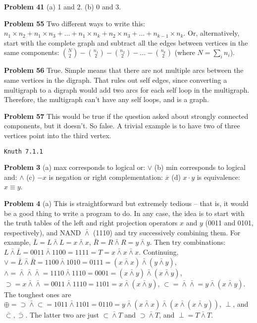 \vskip 0.1in
\noindent
{\bf Problem 41} (a) 1 and 2. (b) 0 and 3.

\vskip 0.1in
\noindent
{\bf Problem 55} Two different ways to write this: $n_1 \times n_2 +
n_1 \times n_3 + \ldots + n_1 \times n_k + n_2 \times n_3 + \ldots + 
n_{k-1} \times n_k$.  Or, alternatively, start with the complete graph
and subtract all the edges between vertices in the same components:
${N \choose 2} - {n_1 \choose 2} - {n_2 \choose 2} - \ldots - {n_k \choose 2}$
(where $N = \sum_i n_i$).

\vskip 0.1in
\noindent
{\bf Problem 56} True.  Simple means that there are not multiple arcs between
the same vertices in the digraph.  That rules out self edges, since converting
a multigraph to a digraph would add two arcs for each self loop in the multigraph.
Therefore, the multigraph can't have any self loops, and is a graph.

\vskip 0.1in
\noindent
{\bf Problem 57} This would be true if the question asked about strongly
connected components, but it doesn't.  So false.  A trivial example is to
have two of three vertices point into the third vertex.

\topglue 0.5in
\centerline{\tt Knuth 7.1.1}
\vskip 0.3in

\noindent
{\bf Problem 3} (a) max corresponds to logical or: $\vee$ (b) min corresponds to 
logical and: $\wedge$ (c) $-x$ is negation or right complementation: $\overline{x}$
(d) $x \cdot y$ is equivalence: $x \equiv y$.

\vskip 0.1in
\noindent
{\bf Problem 4} (a) This is straightforward but extremely tedious -- that is,
it would be a good thing to write a program to do.  In any case, the idea
is to start with the truth tables of the left and right projection operators
$x$ and $y$ (0011 and 0101, respectively), and NAND $\bar \land$ (1110)
and try successively combining them.  For example, $\bar L = L \bar \land L = x \bar
\land x$, $\bar R = R \bar \land R = y \bar \land y$.  Then try combinations:
$L \bar \land \bar L = 0011 \bar \land 1100 = 1111 = T = x \bar \land x \bar \land x$.
Continuing, $\vee = \bar L \bar \land \bar R = 1100 \bar \land 1010 = 0111 =
\left(x \bar \land x\right) \bar \land \left(y \bar \land y\right)$,
$\land = \bar \land \bar \land \bar \land = 1110 \bar \land 1110 = 0001 = 
\left(x \bar \land y \right) \bar \land \left( x \bar \land y \right)$,
$\supset = x \bar \land \bar \land = 0011 \bar \land 1110 = 1101 = 
x \bar \land \left(x \bar \land y\right)$, $\subset = \bar \land \bar \land =
y \bar \land \left(x \bar \land y\right)$.
The toughest ones are $\oplus = \supset \bar \land \subset = 1011 \bar \land 1101 =
0110 = y \bar \land \left(x \bar \land x\right) \bar \land \left(x \bar \land
\left(x \bar \land y \right)\right)$, $\perp$, and $\bar \subset, \bar \supset$.
The latter two are just $\subset \bar \land T$ and $\supset \bar \land T$,
and $\perp = T \bar \land T$.

